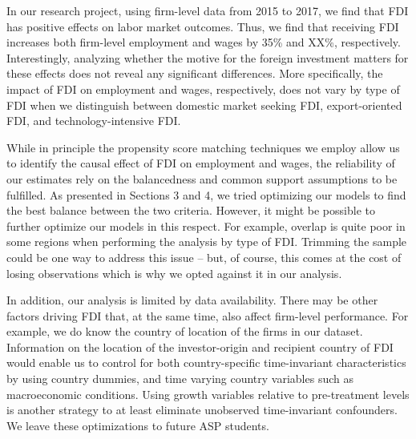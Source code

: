 In our research project, using firm-level data from 2015 to 2017, we find that FDI has positive effects on labor market outcomes. Thus, we find that receiving FDI increases both firm-level employment and wages by 35\% and XX\%, respectively. Interestingly, analyzing whether the motive for the foreign investment matters for these effects does not reveal any significant differences. More specifically, the impact of FDI on employment and wages, respectively, does not vary by type of FDI when we distinguish between domestic market seeking FDI, export-oriented FDI, and technology-intensive FDI.  \\ \par

While in principle the propensity score matching techniques we employ allow us to identify the causal effect of FDI on employment and wages, the reliability of our estimates rely on the balancedness and common support assumptions to be fulfilled. As presented in Sections 3 and 4, we tried optimizing our models to find the best balance between the two criteria. However, it might be possible to further optimize our models in this respect. For example, overlap is quite poor in some regions when performing the analysis by type of FDI. Trimming the sample could be one way to address this issue – but, of course, this comes at the cost of losing observations which is why we opted against it in our analysis.  \\ \par 

In addition, our analysis is limited by data availability. There may be other factors driving FDI that, at the same time, also affect firm-level performance. For example, we do know the country of location of the firms in our dataset. Information on the location of the investor-origin and recipient country of FDI would enable us to control for both country-specific time-invariant characteristics by using country dummies, and time varying country variables such as macroeconomic conditions. Using growth variables relative to pre-treatment levels is another strategy to at least eliminate unobserved time-invariant confounders. We leave these optimizations to future ASP students.  